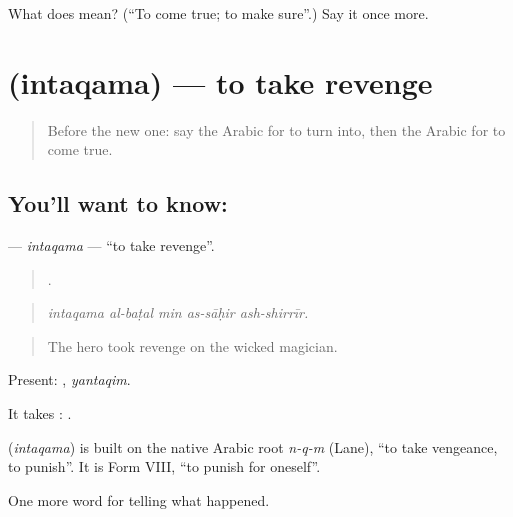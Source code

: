 \begin{tcolorbox}[breakable,colback=teal!4,colframe=teal!35!black,title={Before you move on}]
What does  mean? (\textquotedblleft{}To come true; to make sure\textquotedblright{}.) Say it once more.
\end{tcolorbox}
\section[\texorpdfstring{\ar{انتقم} (intaqama)}{انتقم (intaqama)}]{ (intaqama) — to take revenge}

\label{lesson:AR-C344-intaqama}



\begin{quote}
Before the new one: say the Arabic for to turn into, then the Arabic for to come true.
\end{quote}

\subsection*{You'll want to know: }
\textbf{} — \emph{intaqama} — \textquotedblleft{}to take revenge\textquotedblright{}.

\begin{quote}
    .
\end{quote}

\begin{quote}
\emph{intaqama al-baṭal min as-sāḥir ash-shirrīr.}
\end{quote}

\begin{quote}
The hero took revenge on the wicked magician.
\end{quote}

Present: , \emph{yantaqim}.

It takes :  .

\begin{cousinweb}
\textbf{} (\emph{intaqama}) is built on the native Arabic root \emph{n-q-m} (Lane), \textquotedblleft{}to take vengeance, to punish\textquotedblright{}. It is Form VIII, \textquotedblleft{}to punish for oneself\textquotedblright{}.
\end{cousinweb}

\begin{grammarlens}[title={What you've built}]
One more word for telling what happened.
\end{grammarlens}

